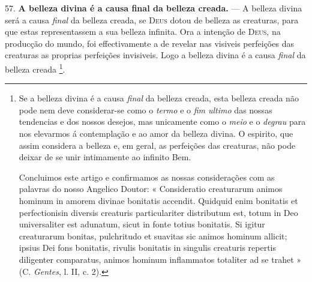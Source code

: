 57. \textbf{A belleza divina é a causa final da belleza creada.} --- A belleza divina será a causa \emph{final} da belleza creada, se \textsc{Deus} dotou de belleza as creaturas, para que estas representassem a sua belleza infinita. Ora a intenção de \textsc{Deus}, na producção do mundo, foi effectivamente a de revelar nas visiveis perfeições das creaturas as proprias perfeições invisiveis. Logo a belleza divina é a causa \emph{final} da belleza creada \footnote{Se a belleza divina é a causa \emph{final} da belleza creada, esta belleza creada não pode nem deve considerar-se como o \emph{termo} e o \emph{fim ultimo} das nossas tendencias e dos nossos desejos, mas unicamente como o \emph{meio} e o \emph{degrau} para nos elevarmos á contemplação e ao amor da belleza divina. O espirito, que assim considera a belleza e, em geral, as perfeições das creaturas, não pode deixar de se unir intimamente ao infinito Bem.\par Concluimos este artigo e confirmamos as nossas considerações com as palavras do nosso Angelico Doutor: « Consideratio creaturarum animos hominum in amorem divinae bonitatis accendit. Quidquid enim bonitatis et perfectionisin diversis creaturis particulariter distributum est, totum in Deo universaliter est adunatum, sicut in fonte totius bonitatis. Si igitur creaturarum bonitas, pulchritudo et suavitas sic animos hominum allicit; ipsius Dei fons bonitatis, rivulis bonitatis in singulis creaturis repertis diligenter comparatus, animos hominum inflammatos totaliter ad se trahet » (C. \emph{Gentes}, l. II, c. 2).}.

